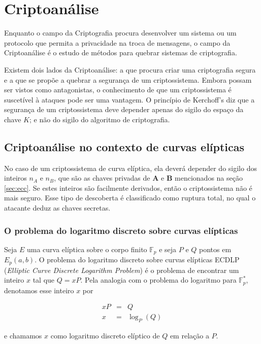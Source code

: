 \chapter{Criptoanálise}
Enquanto o campo da Criptografia procura desenvolver um sistema ou um protocolo que permita a privacidade na troca de mensagens, o campo da Criptoanálise é o estudo de métodos para quebrar sistemas de criptografia.

Existem dois lados da Criptoanálise: a que procura criar uma criptografia segura e a que se propõe a quebrar a segurança de um criptossistema. Embora possam ser vistos como antagonistas, o conhecimento de que um criptossistema é suscetível à ataques pode ser uma vantagem. O princípio de Kerchoff's diz que a segurança de um criptossistema deve depender apenas do sigilo do espaço da chave \(K\); e não do sigilo do algoritmo de criptografia. \cite{Mandy:2007}

\section{Criptoanálise no contexto de curvas elípticas}
No caso de um criptossistema de curva elíptica, ela deverá depender do sigilo dos inteiros \(n_A\) e \(n_B\), que são as chaves privadas de \textbf{A} e \textbf{B} mencionados na seção \ref{sec:ecc}. Se estes inteiros são facilmente derivados, então o criptossistema não é mais seguro. Esse tipo de descoberta é classificado como ruptura total, no qual o atacante deduz as chaves secretas. \cite{Knudsen:1998}

%
%
\subsection{O problema do logaritmo discreto sobre curvas elípticas} \label{ecdpl}
Seja \(E\) uma curva elíptica sobre o corpo finito $\mathbb{F}_p$ e seja \(P\) e \(Q\) pontos em $E_p(a, b)$. O problema do logaritmo discreto sobre curvas elípticas ECDLP (\textit{Elliptic Curve Discrete Logarithm Problem}) é o problema de encontrar um inteiro \(x\) tal que $Q = xP$. Pela analogia com o problema do logaritmo para $\mathbb{F}_p^*$, denotamos esse inteiro \(x\) por

\begin{eqnarray}
xP &=& Q \label{eq:ecdpl1} \\
x &=& \log_P(Q) \label{eq:ecdpl2}
\end{eqnarray}

e chamamos \(x\) como logaritmo discreto elíptico de \(Q\) em relação a \(P\). \cite{Hoffstein:2008}

